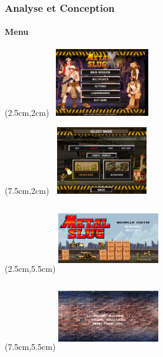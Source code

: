 \begin{frame}

	\frametitle{Analyse et Conception}
	\framesubtitle{Menu}

	\begin{textblock*}{4.5cm}(2.5cm,2cm)
		\includegraphics[width=4.5cm,height=3cm]{figures/menu_jeuOrigine_1.jpg}
	\end{textblock*}

	\begin{textblock*}{4.5cm}(7.5cm,2cm)
		\includegraphics[width=4.5cm,height=3cm]{figures/menu_jeuOrigine_2.jpg}
	\end{textblock*}

	\begin{textblock*}{4.5cm}(2.5cm,5.5cm)
		\includegraphics[width=4.5cm,height=3cm]{figures/menu_ter_1.png}
	\end{textblock*}

	\begin{textblock*}{4.5cm}(7.5cm,5.5cm)
		\includegraphics[width=4.5cm,height=3cm]{figures/menu_ter_2.png}
	\end{textblock*}

\end{frame}
